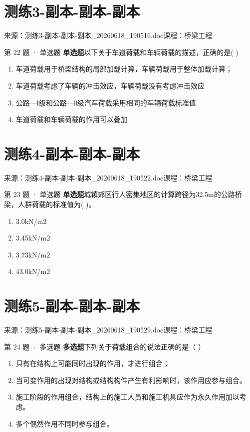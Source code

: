 \documentclass[UTF8,zihao=-4,openany]{ctexbook}
\newenvironment{choices}{\begin{enumerate}[label=\Alph*.,leftmargin=9mm,labelsep=3mm,itemsep=2pt,topsep=4pt]}{\end{enumerate}}
\newcommand{\qtype}[1]{\textcolor{brand}{\sffamily\bfseries #1}}
\newcommand{\sourcefile}[1]{\textcolor{muted}{\small\sffamily 来源：#1}}
\begin{document}
\chapter{测练3-副本-副本-副本}

\sourcefile{测练3-副本-副本-副本\_20260618\_190516.doc}\quad \textcolor{muted}{\small\sffamily 课程：桥梁工程}

\begin{questionbox}{第 22 题 · 单选题}
\qtype{单选题}\quad 以下关于车道荷载和车辆荷载的描述，正确的是( )
\begin{choices}
\item 车道荷载用于桥梁结构的局部加载计算，车辆荷载用于整体加载计算；
\item 车道荷载考虑了车辆的冲击效应，车辆荷载没有考虑冲击效应
\item 公路—Ⅰ级和公路—Ⅱ级汽车荷载采用相同的车辆荷载标准值
\item 车道荷载和车辆荷载的作用可以叠加
\end{choices}
\end{questionbox}

\chapter{测练4-副本-副本-副本}

\sourcefile{测练4-副本-副本-副本\_20260618\_190522.doc}\quad \textcolor{muted}{\small\sffamily 课程：桥梁工程}

\begin{questionbox}{第 23 题 · 单选题}
\qtype{单选题}\quad 城镇郊区行人密集地区的计算跨径为32.5m的公路桥梁，人群荷载的标准值为( )。
\begin{choices}
\item 3.0kN/m2
\item 3.45kN/m2
\item 3.73kN/m2
\item 43.0kN/m2
\end{choices}
\end{questionbox}

\chapter{测练5-副本-副本-副本}

\sourcefile{测练5-副本-副本-副本\_20260618\_190529.doc}\quad \textcolor{muted}{\small\sffamily 课程：桥梁工程}

\begin{questionbox}{第 24 题 · 多选题}
\qtype{多选题}\quad 下列关于荷载组合的说法正确的是（ ）
\begin{choices}
\item 只有在结构上可能同时出现的作用，才进行组合；
\item 当可变作用的出现对结构或结构构件产生有利影响时，该作用应参与组合。
\item 施工阶段的作用组合，结构上的施工人员和施工机具应作为永久作用加以考虑。
\item 多个偶然作用不同时参与组合。
\end{choices}
\end{questionbox}
\end{document}
